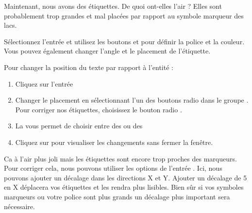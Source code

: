 Maintenant, nous avons des \'etiquettes. De quoi ont-elles l'air ? Elles sont probablement trop grandes et mal plac\'ees par rapport au symbole marqueur des lacs.

S\'electionnez l'entr\'ee  et utilisez les boutons  et  pour d\'efinir la police et la couleur. Vous pouvez \'egalement changer l'angle et le placement de l'\'etiquette.

Pour changer la position du texte par rapport \`a l'entit\'e :

\begin{enumerate}
\item Cliquez sur l'entr\'ee 
\item Changer le placement en s\'electionnant l'un des boutons radio dans le groupe . Pour corriger nos \'etiquettes, choisissez le bouton radio .
\item La  vous permet de choisir entre  des  ou des 
\item Cliquez sur  pour visualiser les changements sans fermer la fen\^etre.
\end{enumerate}

Ca \`a l'air plus joli mais les \'etiquettes sont encore trop proches des marqueurs. Pour corriger cela, nous pouvons utiliser les options de l'entr\'ee . Ici, nous pouvons ajouter un d\'ecalage dans les directions X et Y. Ajouter un d\'ecalage de 5 en X d\'eplacera vos \'etiquettes et les rendra plus lisibles. Bien s\^ur si vos symboles marqueurs ou votre police sont plus grands un d\'ecalage plus important sera n\'ecessaire.

